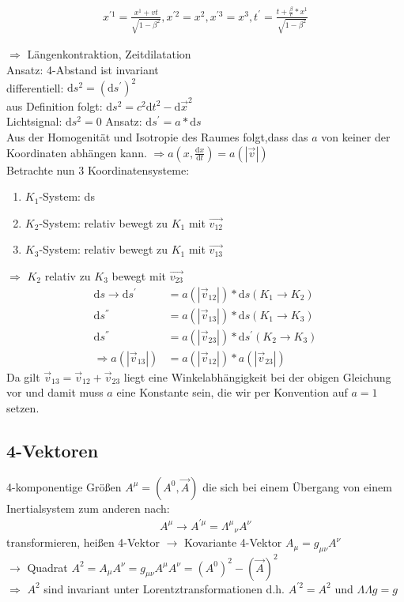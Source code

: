 \documentclass[a4paper]{article}
\begin{document}
\begin{align}
x^{'1}=\frac{x^1+vt}{\sqrt{1-\beta^2}}, x^{'2}=x^2, x^{'3}=x^3,
t^{'}=\frac{t+\frac{\beta}{c}*x^1}{\sqrt{1-\beta^2}}
\end{align}

$\Rightarrow$ Längenkontraktion, Zeitdilatation\\
Ansatz: 4-Abstand ist invariant\\
differentiell: $\mathrm{d}s^2=(\mathrm{d}s^{'})^2$\\
aus Definition folgt: $\mathrm{d}s^2=c^2\mathrm{d}t^2-\mathrm{d}\vec{x}^2$\\
Lichtsignal: $\mathrm{d}s^2=0$
Ansatz: $\mathrm{d}s^{'}=a*\mathrm{d}s$\\
Aus der Homogenität und Isotropie des Raumes folgt,dass das $a$ von keiner
der Koordinaten abhängen kann. $\Rightarrow a(x,\frac{\mathrm{d}x}{\mathrm{d}t})=a(|\vec{v}|)$\\
Betrachte nun 3 Koordinatensysteme:
\begin{enumerate}
  \item $K_1$-System: ds
  \item $K_2$-System: relativ bewegt zu $K_1$ mit $\vec{v_{12}}$
  \item $K_3$-System: relativ bewegt zu $K_1$ mit $\vec{v_{13}}$
\end{enumerate}
$\Rightarrow$ $K_2$ relativ zu $K_3$ bewegt mit $\vec{v_{23}}$
\begin{align}
\mathrm{d}s \rightarrow \mathrm{d}s^{'}&=a(|\vec{v}_{12}|)*\mathrm{d}s (K_1 \rightarrow K_2)\\
\mathrm{d}s^{''}&=a(|\vec{v}_{13}|)*\mathrm{d}s (K_1 \rightarrow K_3)\\
\mathrm{d}s^{''}&=a(|\vec{v}_{23}|)*\mathrm{d}s^{'} (K_2 \rightarrow K_3)\\
\Rightarrow  a(|\vec{v}_{13}|)&=a(|\vec{v}_{12}|)*a(|\vec{v}_{23}|)
\end{align}
Da gilt $\vec{v}_{13}=\vec{v}_{12}+\vec{v}_{23}$ liegt eine Winkelabhängigkeit
bei der obigen Gleichung vor und damit muss $a$ eine Konstante sein, die wir per
Konvention auf $a=1$ setzen.

\subsection{4-Vektoren}
4-komponentige Größen $A^\mu=(A^0,\vec{A})$ die sich bei einem Übergang von
einem Inertialsystem zum anderen nach:
\begin{align}
A^{\mu}\rightarrow A^{'\mu}=\Lambda^\mu{}_\nu A^\nu
\end{align}
transformieren, heißen 4-Vektor
$\rightarrow$ Kovariante 4-Vektor $A_\mu=g_{\mu \nu} A^\nu$\\
$\rightarrow$ Quadrat $A^2 = A_\mu A^\nu= g_{\mu \nu} A^\mu  A^\nu =
(A^0)^2-(\vec{A})^2$\\
$\Rightarrow$ $A^2$ sind invariant unter Lorentztransformationen d.h.
$A^{'2}=A^2$ und $\Lambda \Lambda g=g$
\end{document}
